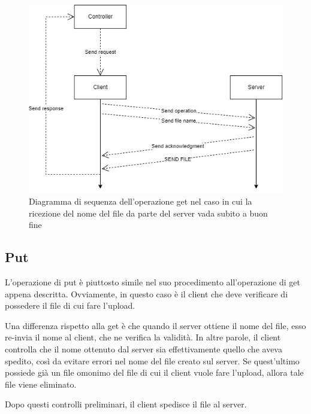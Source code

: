 \documentclass[a4paper,12pt]{report}
\begin{document}
\begin{figure}[H]
    \centering
    \includegraphics[scale=0.55]{img/get.jpg}
    \caption{Diagramma di sequenza dell'operazione get nel caso in cui la ricezione del nome del file da parte del server vada subito a buon fine}
\end{figure}

\subsection{Put}
L'operazione di put è piuttosto simile nel suo procedimento all'operazione di get appena descritta. Ovviamente, in questo caso è il client che deve verificare di possedere il file di cui fare l'upload.

Una differenza rispetto alla get è che quando il server ottiene il nome del file, esso re-invia il nome al client, che ne verifica la validità. In altre parole, il client controlla che il nome ottenuto dal server sia effettivamente quello che aveva spedito, così da evitare errori nel nome del file creato sul server. Se quest'ultimo possiede già un file omonimo del file di cui il client vuole fare l'upload, allora tale file viene eliminato.

Dopo questi controlli preliminari, il client spedisce il file al server.
\end{document}
